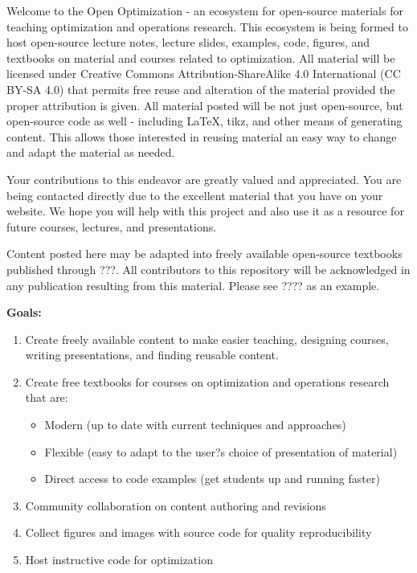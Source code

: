 \documentclass[../open-optimization/open-optimization.tex]{subfiles}
\begin{document}
Welcome to the Open Optimization - an ecosystem for open-source materials for teaching optimization and operations research.  This ecosystem is being formed to host open-source lecture notes, lecture slides, examples, code, figures, and textbooks on material and courses related to optimization.  All material will be licensed under Creative Commons Attribution-ShareAlike 4.0 International (CC BY-SA 4.0) that permits free reuse and alteration of the material provided the proper attribution is given.  All material posted will be not just open-source, but open-source code as well - including LaTeX, tikz, and other means of generating content.  This allows those interested in reusing material an easy way to change and adapt the material as needed.

Your contributions to this endeavor are greatly valued and appreciated.  You are being contacted directly due to the excellent material that you have on your website.  We hope you will help with this project and also use it as a resource for future courses, lectures, and presentations.

Content posted here may be adapted into freely available open-source textbooks published through ???.  All contributors to this repository will be acknowledged in any publication resulting from this material.  Please see ???? as an example.



\textbf{Goals:}
\begin{enumerate}
\item Create freely available content to make easier teaching, designing courses, writing presentations, and finding reusable content.
\item Create free textbooks for courses on optimization and operations research that are:
\begin{itemize}
\item Modern (up to date with current techniques and approaches)
\item Flexible (easy to adapt to the user?s choice of presentation of material)
\item Direct access to code examples (get students up and running faster)
\end{itemize}
\item Community collaboration on content authoring and revisions
\item Collect figures and images with source code for quality reproducibility
\item Host instructive code for optimization
\end{enumerate}










\end{document}
